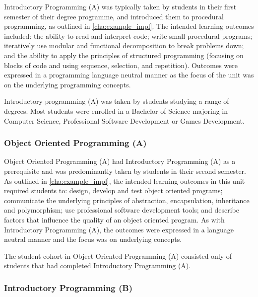 Introductory Programming (A) was typically taken by students in their first semester of their degree programme, and introduced them to procedural programming, as outlined in \cref{cha:example_impl}. The intended learning outcomes included: the ability to read and interpret code; write small procedural programs; iteratively use modular and functional decomposition to break problems down; and the ability to apply the principles of structured programming (focusing on blocks of code and using sequence, selection, and repetition). Outcomes were expressed in a programming language neutral manner as the focus of the unit was on the underlying programming concepts.

Introductory programming (A) was taken by students studying a range of degrees. Most students were enrolled in a Bachelor of Science majoring in Computer Science, Professional Software Development or Games Development.


\subsubsection{Object Oriented Programming (A)} %
\label{ssub:object_oriented_programming_a}

Object Oriented Programming (A) had Introductory Programming (A) as a prerequisite and was predominantly taken by students in their second semester. As outlined in \cref{cha:example_impl}, the intended learning outcomes in this unit required students to: design, develop and test object oriented programs; communicate the underlying principles of abstraction, encapsulation, inheritance and polymorphism; use professional software development tools; and describe factors that influence the quality of an object oriented program. As with Introductory Programming (A), the outcomes were expressed in a language neutral manner and the focus was on underlying concepts.

The student cohort in Object Oriented Programming (A) consisted only of students that had completed Introductory Programming (A).


\subsubsection{Introductory Programming (B)} %
\label{ssub:introductory_programming_b}

